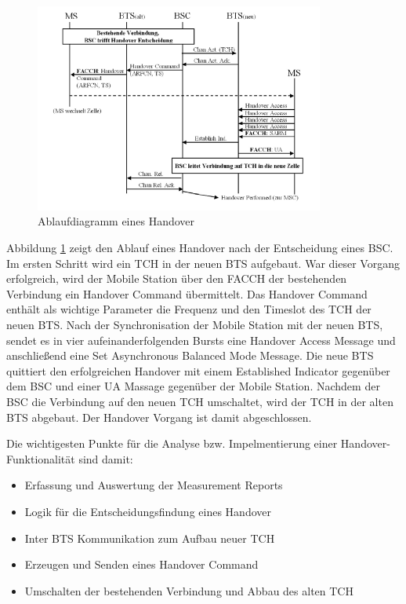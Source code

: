 \begin{figure}[h!]
  \centering
  \includegraphics[width=0.85\textwidth]{img/handover.png}
  \caption{Ablaufdiagramm eines Handover \cite{bib:grundkursmks}}
  \label{fig:adhandover}
\end{figure}

Abbildung \ref{fig:adhandover} zeigt den Ablauf eines Handover nach der Entscheidung eines BSC. Im ersten Schritt wird ein TCH in der neuen BTS aufgebaut. War dieser Vorgang erfolgreich, wird der Mobile Station über den FACCH der bestehenden Verbindung ein Handover Command übermittelt. Das Handover Command enthält als wichtige Parameter die Frequenz und den Timeslot des TCH der neuen BTS. Nach der Synchronisation der Mobile Station mit der neuen BTS, sendet es in vier aufeinanderfolgenden Bursts eine Handover Access Message und anschließend eine Set Asynchronous Balanced Mode Message. Die neue BTS quittiert den erfolgreichen Handover mit einem Established Indicator gegenüber dem BSC und einer UA Massage gegenüber der Mobile Station. Nachdem der BSC die Verbindung auf den neuen TCH umschaltet, wird der TCH in der alten BTS abgebaut. Der Handover Vorgang ist damit abgeschlossen.

Die wichtigesten Punkte für die Analyse bzw. Impelmentierung einer Handover-Funktionalität sind damit:

\begin{itemize}
 \item Erfassung und Auswertung der Measurement Reports
 \item Logik für die Entscheidungsfindung eines Handover
 \item Inter BTS Kommunikation zum Aufbau neuer TCH
 \item Erzeugen und Senden eines Handover Command
 \item Umschalten der bestehenden Verbindung und Abbau des alten TCH
\end{itemize}

